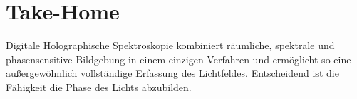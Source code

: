 \documentclass[10pt,twocolumn,a4paper]{article}
\begin{document}
\section{Take-Home}
Digitale Holographische Spektroskopie kombiniert räumliche, spektrale und phasensensitive Bildgebung in einem einzigen Verfahren und ermöglicht so eine außergewöhnlich vollständige Erfassung des Lichtfeldes. Entscheidend ist die Fähigkeit die Phase des Lichts abzubilden.

\AtNextBibliography{\small}
\printbibliography
\end{document}
